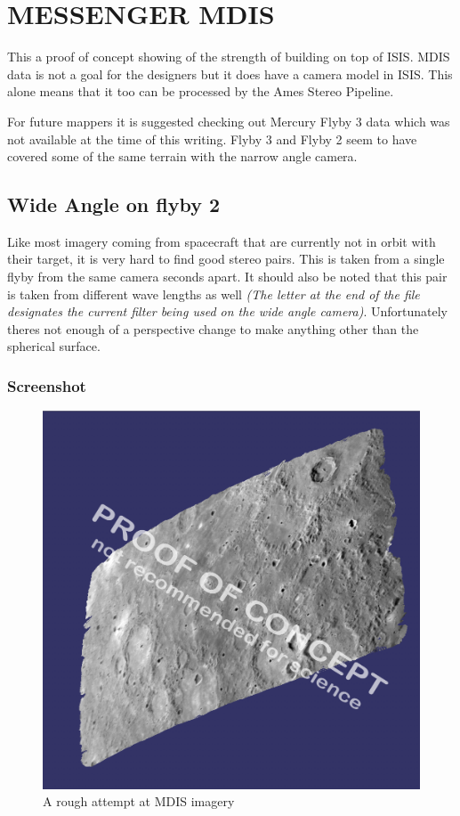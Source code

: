 \section{MESSENGER MDIS}

This a proof of concept showing of the strength of building on top of
ISIS. MDIS data is not a goal for the designers but it does have a
camera model in ISIS. This alone means that it too can be processed by
the Ames Stereo Pipeline.

For future mappers it is suggested checking out Mercury Flyby 3 data
which was not available at the time of this writing. Flyby 3 and Flyby
2 seem to have covered some of the same terrain with the narrow angle
camera.

\subsection{Wide Angle on flyby 2}

Like most imagery coming from spacecraft that are currently not in
orbit with their target, it is very hard to find good stereo
pairs. This is taken from a single flyby from the same camera seconds
apart. It should also be noted that this pair is taken from different
wave lengths as well \emph{(The letter at the end of the file
  designates the current filter being used on the wide angle
  camera)}. Unfortunately theres not enough of a perspective change to
make anything other than the spherical surface.

\subsubsection*{Screenshot}

\begin{figure}[h!]
  \begin{center}
  \includegraphics[width=5in]{images/examples/mdis/mdis_wide_example.png}
  \end{center}
  \caption{ A rough attempt at MDIS imagery }
  \label{fig:mdis_attempt}
\end{figure}

